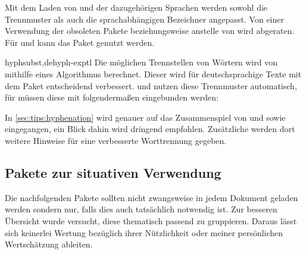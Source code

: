 \begin{packages}
  Mit dem Laden von  und der dazugehörigen Sprachen werden 
  sowohl die Trennmuster als auch die sprachabhängigen Bezeichner angepasst.
  Von einer Verwendung der obsoleten Pakete  beziehungsweise 
   anstelle von  wird abgeraten. Für 
   und  kann das Paket  
  genutzt werden.
\item[hyphsubst,dehyph-exptl]
  Die möglichen Trennstellen von Wörtern wird von  mithilfe 
  eines Algorithmus berechnet. Dieser wird für deutschsprachige Texte mit dem 
  Paket  entscheidend verbessert.  und 
   nutzen diese Trennmuster automatisch, für  
  müssen diese mit folgendermaßen eingebunden werden:
  \begin{Code}[escapechar=§]
    \usepackage[ngerman=ngerman-x-latest]{hyphsubst}
  \end{Code}\vspace{-\baselineskip}%
  In \autoref{sec:tips:hyphenation} wird genauer auf das Zusammenspiel von 
   und  sowie  eingegangen, 
  ein Blick dahin wird dringend empfohlen. Zusätzliche werden dort weitere 
  Hinweise für eine verbesserte Worttrennung gegeben.
\end{packages}


\subsection{Pakete zur situativen Verwendung}
Die nachfolgenden Pakete sollten nicht zwangsweise in jedem Dokument geladen 
werden sondern nur, falls dies auch tatsächlich notwendig ist. Zur besseren 
Übersicht wurde versucht, diese thematisch passend zu gruppieren. Daraus lässt 
sich keinerlei Wertung bezüglich ihrer Nützlichkeit oder meiner persönlichen 
Wertschätzung ableiten.


